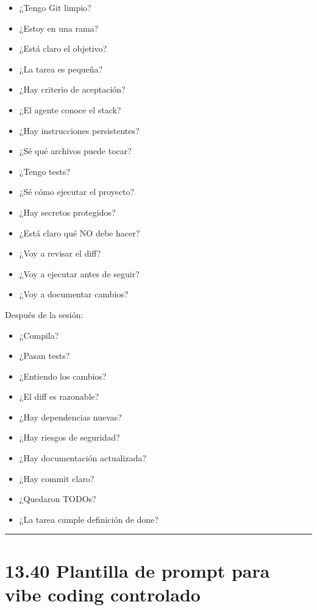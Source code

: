 \begin{itemize}
\tightlist
\item
  ¿Tengo Git limpio?
\item
  ¿Estoy en una rama?
\item
  ¿Está claro el objetivo?
\item
  ¿La tarea es pequeña?
\item
  ¿Hay criterio de aceptación?
\item
  ¿El agente conoce el stack?
\item
  ¿Hay instrucciones persistentes?
\item
  ¿Sé qué archivos puede tocar?
\item
  ¿Tengo tests?
\item
  ¿Sé cómo ejecutar el proyecto?
\item
  ¿Hay secretos protegidos?
\item
  ¿Está claro qué NO debe hacer?
\item
  ¿Voy a revisar el diff?
\item
  ¿Voy a ejecutar antes de seguir?
\item
  ¿Voy a documentar cambios?
\end{itemize}

Después de la sesión:

\begin{itemize}
\tightlist
\item
  ¿Compila?
\item
  ¿Pasan tests?
\item
  ¿Entiendo los cambios?
\item
  ¿El diff es razonable?
\item
  ¿Hay dependencias nuevas?
\item
  ¿Hay riesgos de seguridad?
\item
  ¿Hay documentación actualizada?
\item
  ¿Hay commit claro?
\item
  ¿Quedaron TODOs?
\item
  ¿La tarea cumple definición de done?
\end{itemize}

\begin{center}\rule{0.5\linewidth}{0.5pt}\end{center}

\section{13.40 Plantilla de prompt para vibe coding
controlado}\label{plantilla-de-prompt-para-vibe-coding-controlado}

